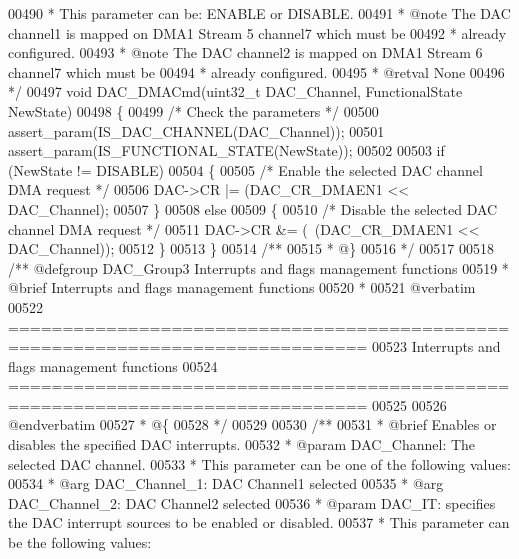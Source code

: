 \begin{DoxyCode}
00490 \textcolor{comment}{  *          This parameter can be: ENABLE or DISABLE.}
00491 \textcolor{comment}{  * @note   The DAC channel1 is mapped on DMA1 Stream 5 channel7 which must be}
00492 \textcolor{comment}{  *          already configured.}
00493 \textcolor{comment}{  * @note   The DAC channel2 is mapped on DMA1 Stream 6 channel7 which must be}
00494 \textcolor{comment}{  *          already configured.    }
00495 \textcolor{comment}{  * @retval None}
00496 \textcolor{comment}{  */}
00497 \textcolor{keywordtype}{void} DAC_DMACmd(uint32\_t DAC\_Channel, FunctionalState NewState)
00498 \{
00499   \textcolor{comment}{/* Check the parameters */}
00500   assert_param(IS\_DAC\_CHANNEL(DAC\_Channel));
00501   assert_param(IS\_FUNCTIONAL\_STATE(NewState));
00502 
00503   \textcolor{keywordflow}{if} (NewState != DISABLE)
00504   \{
00505     \textcolor{comment}{/* Enable the selected DAC channel DMA request */}
00506     DAC->CR |= (DAC_CR_DMAEN1 << DAC\_Channel);
00507   \}
00508   \textcolor{keywordflow}{else}
00509   \{
00510     \textcolor{comment}{/* Disable the selected DAC channel DMA request */}
00511     DAC->CR &= (~(DAC_CR_DMAEN1 << DAC\_Channel));
00512   \}
00513 \}
00514 \textcolor{comment}{/**}
00515 \textcolor{comment}{  * @\}}
00516 \textcolor{comment}{  */}
00517 
00518 \textcolor{comment}{/** @defgroup DAC\_Group3 Interrupts and flags management functions}
00519 \textcolor{comment}{ *  @brief   Interrupts and flags management functions}
00520 \textcolor{comment}{ *}
00521 \textcolor{comment}{@verbatim   }
00522 \textcolor{comment}{ ===============================================================================}
00523 \textcolor{comment}{                   Interrupts and flags management functions}
00524 \textcolor{comment}{ ===============================================================================  }
00525 \textcolor{comment}{}
00526 \textcolor{comment}{@endverbatim}
00527 \textcolor{comment}{  * @\{}
00528 \textcolor{comment}{  */}
00529 
00530 \textcolor{comment}{/**}
00531 \textcolor{comment}{  * @brief  Enables or disables the specified DAC interrupts.}
00532 \textcolor{comment}{  * @param  DAC\_Channel: The selected DAC channel. }
00533 \textcolor{comment}{  *          This parameter can be one of the following values:}
00534 \textcolor{comment}{  *            @arg DAC\_Channel\_1: DAC Channel1 selected}
00535 \textcolor{comment}{  *            @arg DAC\_Channel\_2: DAC Channel2 selected}
00536 \textcolor{comment}{  * @param  DAC\_IT: specifies the DAC interrupt sources to be enabled or disabled. }
00537 \textcolor{comment}{  *          This parameter can be the following values:}

\end{DoxyCode}
